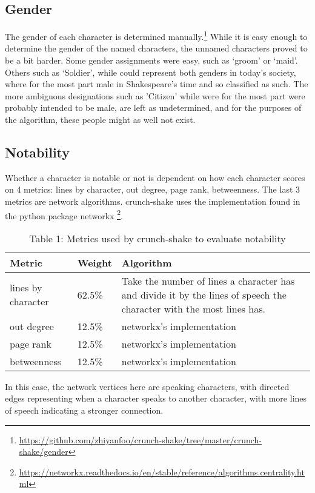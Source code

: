 \documentclass[12pt]{article}
\begin{document}
\subsection{Gender}
\label{sub:gender}

The gender of each character is determined manually.\footnote{\url{https://github.com/zhiyanfoo/crunch-shake/tree/master/crunch-shake/gender}}
While it is easy enough to determine the gender of the named characters, the
unnamed characters proved to be a bit harder. Some gender assignments were
easy, such as `groom' or `maid'. Others such as `Soldier', while could
represent both genders in today's society, where for the most part male in
Shakespeare's time and so classified as such. The more ambiguous designations
such as 'Citizen' while were for the most part were probably intended to be male,
are left as undetermined, and for the purposes of the algorithm, these people
might as well not exist.

\subsection{Notability}
\label{sub:notability}

Whether a character is notable or not is dependent on how each character
scores on 4 metrics: lines by character, out degree, page rank, betweenness.
The last 3 metrics are network algorithms. crunch-shake uses the
implementation found in the python package networkx
\footnote{\url{https://networkx.readthedocs.io/en/stable/reference/algorithms.centrality.html}}.
\begin{center}
    \begin{table}
    \caption*{Table 1: Metrics used by crunch-shake to evaluate
    notability}
    \centering
    \begin{tabular}{ l l p{5cm} }
        \toprule
    Metric & Weight & Algorithm \\ \midrule
        lines by character & 62.5\% & Take the number of lines a character has
        and divide it by the lines of speech the character with
        the most lines has.\\ \hline
        out degree & 12.5\% & networkx's implementation \\ \hline
        page rank & 12.5\% & networkx's implementation \\ \hline
        betweenness & 12.5\% & networkx's implementation \\
    \bottomrule
    \end{tabular}
    \end{table}
\end{center}
In this case, the network vertices here are speaking characters, with directed
edges representing when a character speaks to another character, with more
lines of speech indicating a stronger connection.
\end{document}
